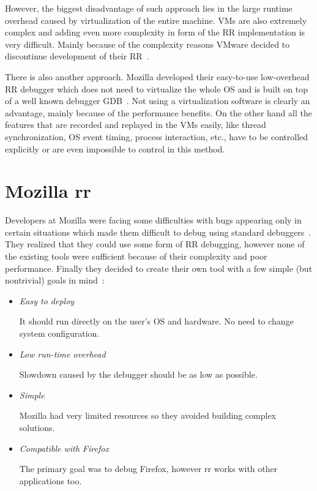 \documentclass[thesis=M,english,hidelinks]{FITthesis}[2012/10/20]
\begin{document}
However, the biggest disadvantage of such approach lies in the large runtime overhead caused by virtualization of the entire machine. VMs are also extremely complex and adding even more complexity in form of the RR implementation is very difficult. Mainly because of the complexity reasons VMware decided to discontinue development of their RR~\cite{vmware_end}.\par

There is also another approach. Mozilla developed their easy-to-use low-overhead RR debugger which does not need to virtualize the whole OS and is built on top of a well known debugger GDB~\cite{rr}. Not using a virtualization software is clearly an advantage, mainly because of the performance benefits. On the other hand all the features that are recorded and replayed in the VMs easily, like thread synchronization, OS event timing, process interaction, etc., have to be controlled explicitly or are even impossible to control in this method.\par
		
	\section{Mozilla rr}
	Developers at Mozilla were facing some difficulties with bugs appearing only in certain situations which made them difficult to debug using standard debuggers~\cite{rr_vid}. They realized that they could use some form of RR debugging, however none of the existing tools were sufficient because of their complexity and poor performance. Finally they decided to create their own tool with a few simple (but nontrivial) goals in mind~\cite{rr}:
	\begin{itemize}
		\item \emph{Easy to deploy}\par
			It should run directly on the user's OS and hardware. No need to change system configuration.
		\item \emph{Low run-time overhead}\par
			Slowdown caused by the debugger should be as low as possible.
		\item \emph{Simple}\par
			Mozilla had very limited resources so they avoided building complex solutions.
		\item \emph{Compatible with Firefox}\par
			The primary goal was to debug Firefox, however rr works with other applications too.
	\end{itemize}
	
\end{document}
